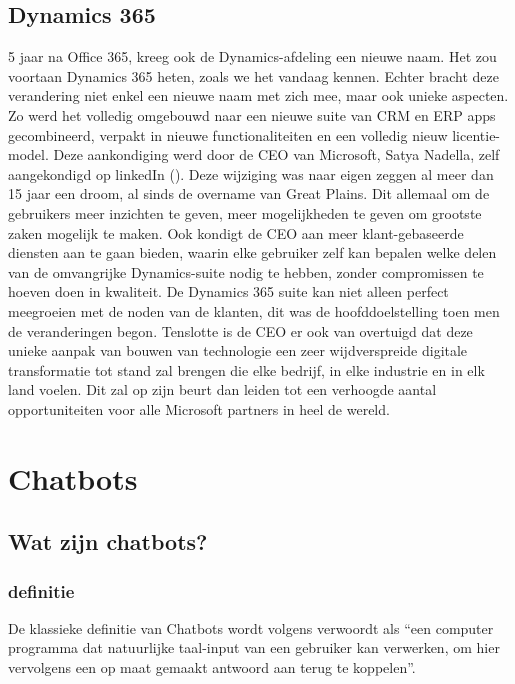 \subsection{Dynamics 365}
5 jaar na Office 365, kreeg ook de Dynamics-afdeling een nieuwe naam. Het zou voortaan Dynamics 365 heten, zoals we het vandaag kennen. Echter bracht deze verandering niet enkel een nieuwe naam met zich mee, maar ook unieke aspecten. Zo werd het volledig omgebouwd naar een nieuwe suite van CRM en ERP apps gecombineerd, verpakt in nieuwe functionaliteiten en een volledig nieuw licentie-model. 
Deze aankondiging werd door de CEO van Microsoft, Satya Nadella, zelf aangekondigd op linkedIn (\textcite{Nadella2016}). Deze wijziging was naar eigen zeggen al meer dan 15 jaar een droom, al sinds de overname van Great Plains. Dit allemaal om de gebruikers meer inzichten te geven, meer mogelijkheden te geven om grootste zaken mogelijk te maken. Ook kondigt de CEO aan meer klant-gebaseerde diensten aan te gaan bieden, waarin elke gebruiker zelf kan bepalen welke delen van de omvangrijke Dynamics-suite nodig te hebben, zonder compromissen te hoeven doen in kwaliteit. De Dynamics 365 suite kan niet alleen perfect meegroeien met de noden van de klanten, dit was de hoofddoelstelling toen men de veranderingen begon. 
Tenslotte is de CEO er ook van overtuigd dat deze unieke aanpak van bouwen van technologie een zeer wijdverspreide digitale transformatie tot stand zal brengen die elke bedrijf, in elke industrie en in elk land voelen. Dit zal op zijn beurt dan leiden tot een verhoogde aantal opportuniteiten voor alle Microsoft partners in heel de wereld. 


\section{Chatbots}
\subsection{Wat zijn chatbots?}
\subsubsection{definitie}
De klassieke definitie van Chatbots wordt volgens \textcite{Khan2017} verwoordt als “een computer programma dat natuurlijke taal-input van een gebruiker kan verwerken, om hier vervolgens een op maat gemaakt antwoord aan terug te koppelen”. 

